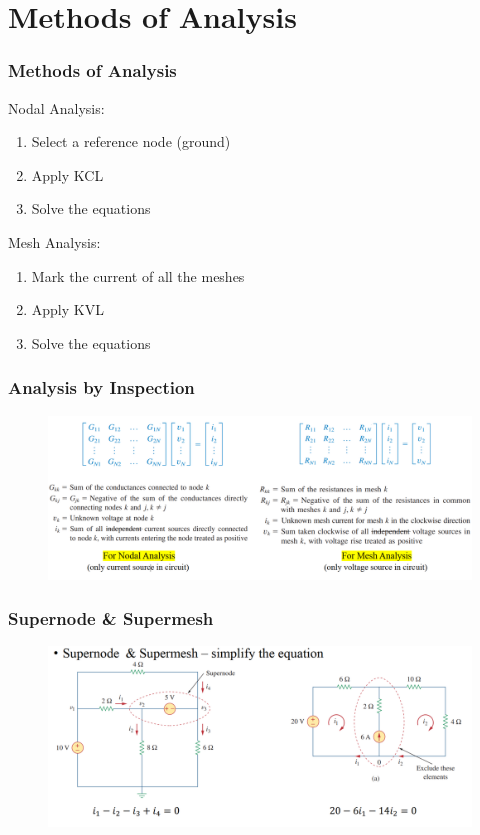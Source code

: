 \documentclass{beamer}
\begin{document}
\section{Methods of Analysis}
\begin{frame}
\frametitle{Methods of Analysis}
Nodal Analysis:
\begin{enumerate}
    \item Select a reference node (ground)
    \item Apply KCL
    \item Solve the equations
\end{enumerate}
Mesh Analysis:
\begin{enumerate}
    \item Mark the current of all the meshes
    \item Apply KVL
    \item Solve the equations
\end{enumerate}

\end{frame}
\begin{frame}
\frametitle{Analysis by Inspection}
\begin{figure}[H]
        \centering
        \includegraphics[width=1\textwidth]{ycy/analysis.png}
    \end{figure}
\end{frame}
\begin{frame}
\frametitle{Supernode \& Supermesh}
\begin{figure}[H]
        \centering
        \includegraphics[width=1\textwidth]{ycy/super.png}
    \end{figure}
\end{frame}
\end{document}
